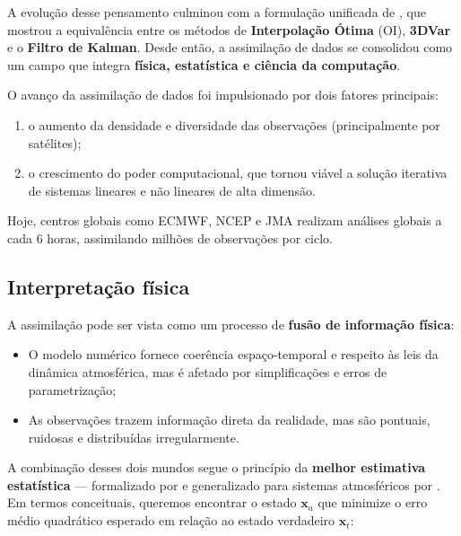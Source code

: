 A evolução desse pensamento culminou com a formulação unificada de \citet{Lorenc1986}, que mostrou a equivalência entre os métodos de \textbf{Interpolação Ótima} (OI), \textbf{3DVar} e o \textbf{Filtro de Kalman}.  
Desde então, a assimilação de dados se consolidou como um campo que integra \textbf{física, estatística e ciência da computação}.

\begin{tcolorbox}[colback=gray!10!white,title={Comentário histórico}]
O avanço da assimilação de dados foi impulsionado por dois fatores principais:
\begin{enumerate}
  \item o aumento da densidade e diversidade das observações (principalmente por satélites);
  \item o crescimento do poder computacional, que tornou viável a solução iterativa de sistemas lineares e não lineares de alta dimensão.
\end{enumerate}
Hoje, centros globais como ECMWF, NCEP e JMA realizam análises globais a cada 6 horas, assimilando milhões de observações por ciclo.
\end{tcolorbox}

\subsection*{Interpretação física}

A assimilação pode ser vista como um processo de \textbf{fusão de informação física}:
\begin{itemize}
    \item O modelo numérico fornece coerência espaço-temporal e respeito às leis da dinâmica atmosférica, mas é afetado por simplificações e erros de parametrização;
    \item As observações trazem informação direta da realidade, mas são pontuais, ruidosas e distribuídas irregularmente.
\end{itemize}

A combinação desses dois mundos segue o princípio da \textbf{melhor estimativa estatística} --- formalizado por \citet{Kalman1960} e generalizado para sistemas atmosféricos por \citet{Lorenc1986}.  
Em termos conceituais, queremos encontrar o estado \( \mathbf{x}_a \) que minimize o erro médio quadrático esperado em relação ao estado verdadeiro \( \mathbf{x}_t \):

